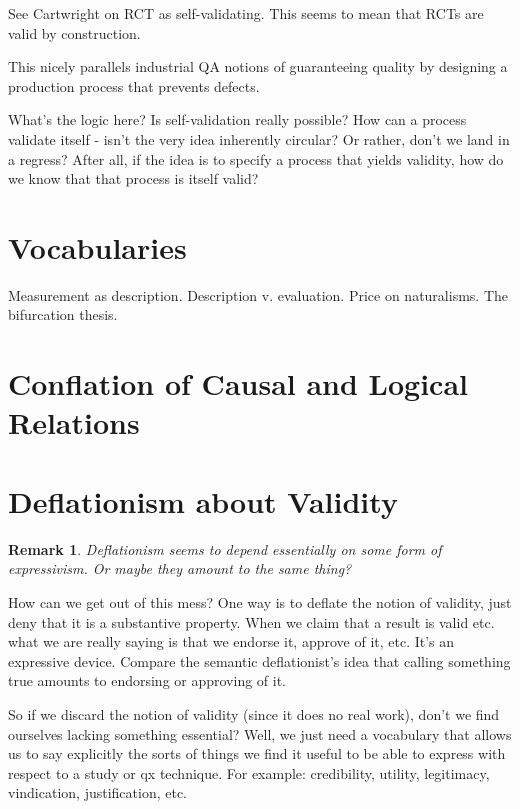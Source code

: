 \documentclass[11pt,twoside]{article}
\newtheorem{remark}{Remark}
\begin{document}
See Cartwright on RCT as self-validating.  This seems to mean that
RCTs are valid by construction.

This nicely parallels industrial QA notions of guaranteeing quality by
designing a production process that prevents defects.

What's the logic here?  Is self-validation really possible?  How can a
process validate itself - isn't the very idea inherently circular?  Or
rather, don't we land in a regress?  After all, if the idea is to
specify a process that yields validity, how do we know that that
process is itself valid?

\section{Vocabularies}

Measurement as description.  Description v. evaluation.  Price on
naturalisms.  The bifurcation thesis.

\section{Conflation of Causal and Logical Relations}



\section{Deflationism about Validity}

\begin{remark}
  Deflationism seems to depend essentially on some form of
  expressivism.  Or maybe they amount to the same thing?
\end{remark}

How can we get out of this mess?  One way is to deflate the notion of
validity, just deny that it is a substantive property.  When we claim
that a result is valid etc. what we are really saying is that we
endorse it, approve of it, etc.  It's an expressive device.  Compare
the semantic deflationist's idea that calling something true amounts
to endorsing or approving of it.

So if we discard the notion of validity (since it does no real work),
don't we find ourselves lacking something essential?  Well, we just
need a vocabulary that allows us to say explicitly the sorts of things
we find it useful to be able to express with respect to a study or qx
technique.  For example: credibility, utility, legitimacy,
vindication, justification, etc.
\end{document}

